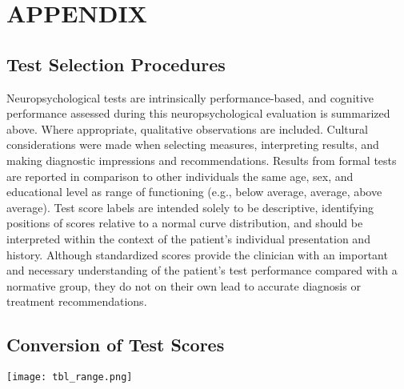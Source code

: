 \documentclass[
  letterpaper,
  DIV=11,
  numbers=noendperiod,
  oneside]{scrartcl}
\begin{document}
\newpage{}

\hypertarget{appendix}{%
\section{APPENDIX}\label{appendix}}

\hypertarget{test-selection-procedures}{%
\subsection{Test Selection Procedures}\label{test-selection-procedures}}

Neuropsychological tests are intrinsically performance-based, and
cognitive performance assessed during this neuropsychological evaluation
is summarized above. Where appropriate, qualitative observations are
included. Cultural considerations were made when selecting measures,
interpreting results, and making diagnostic impressions and
recommendations. Results from formal tests are reported in comparison to
other individuals the same age, sex, and educational level as range of
functioning (e.g., below average, average, above average). Test score
labels are intended solely to be descriptive, identifying positions of
scores relative to a normal curve distribution, and should be
interpreted within the context of the patient's individual presentation
and history. Although standardized scores provide the clinician with an
important and necessary understanding of the patient's test performance
compared with a normative group, they do not on their own lead to
accurate diagnosis or treatment recommendations.

\hypertarget{conversion-of-test-scores}{%
\subsection{Conversion of Test Scores}\label{conversion-of-test-scores}}

\texttt{[image: tbl\_range.png]}
\end{document}
